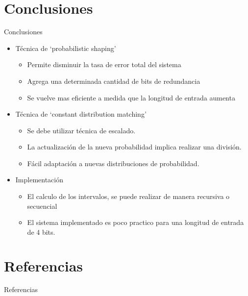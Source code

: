 \documentclass[xcolor=table]{beamer}
\begin{document}
\section{Conclusiones}
\begin{frame}{Conclusiones}
    \begin{itemize}
    \item Técnica de `probabilistic shaping'
    \begin{itemize}
        \item Permite disminuir la tasa de error total del sistema
        \item Agrega una determinada cantidad de bits de redundancia
        \item Se vuelve mas eficiente a medida que la longitud de entrada aumenta 
    \end{itemize}
    \item Técnica de `constant distribution matching'
    \begin{itemize}
        \item Se debe utilizar técnica de escalado.
        \item La actualización de la nueva probabilidad implica realizar una división.
        \item Fácil adaptación a nuevas distribuciones de probabilidad. 
    \end{itemize}
    \item Implementación 
    \begin{itemize}
        \item El calculo de los intervalos, se puede realizar de manera recursiva o secuencial
        \item  El sistema implementado es poco practico para una longitud de entrada de 4 bits. 
    \end{itemize}
    \end{itemize}
\end{frame}

%
%

\section{Referencias}
\begin{frame}{Referencias}
        
        
\end{frame}
\end{document}
